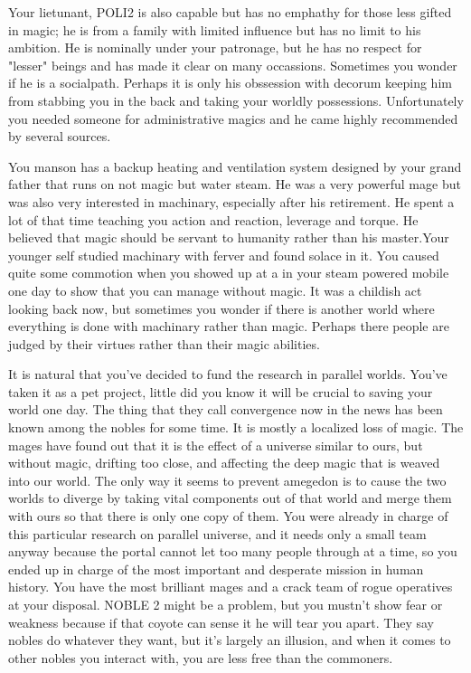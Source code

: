 \documentclass[char]{guildcamp3}
\begin{document}
Your lietunant, POLI2 is also capable but has no emphathy for those less gifted in magic; he is from a family with limited influence but has no limit to his ambition. He is nominally under your patronage, but he has no respect for "lesser" beings and has made it clear on many occassions. Sometimes you wonder if he is a socialpath. Perhaps it is only his obssession with decorum keeping him from stabbing you in the back and taking your worldly possessions. Unfortunately you needed someone for administrative magics and he came highly recommended by several sources. 

You manson has a backup heating and ventilation system designed by your grand father that runs on not magic but water steam. He was a very powerful mage but was also very interested in machinary, especially after his retirement. He spent a lot of that time teaching you action and reaction, leverage and torque. He believed that magic should be servant to humanity rather than his master.Your younger self studied machinary with ferver and found solace in it. You caused quite some commotion when you showed up at a in your steam powered mobile one day to show that you can manage without magic. It was a childish act looking back now, but sometimes you wonder if there is another world where everything is done with machinary rather than magic. Perhaps there people are judged by their virtues rather than their magic abilities.

It is natural that you've decided to fund the research in parallel worlds. You've taken it as a pet project, little did you know it will be crucial to saving your world one day. The thing that they call convergence now in the news has been known among the nobles for some time. It is mostly a localized loss of magic. The mages have found out that it is the effect of a universe similar to ours, but without magic, drifting too close, and affecting the deep magic that is weaved into our world. The only way it seems to prevent amegedon is to cause the two worlds to diverge by taking vital components out of that world and merge them with ours so that there is only one copy of them. You were already in charge of this particular research on parallel universe, and it needs only a small team anyway because the portal cannot let too many people through at a time, so you ended up in charge of the most important and desperate mission in human history. You have the most brilliant mages and a crack team of rogue operatives at your disposal. NOBLE 2 might be a problem, but you mustn't show fear or weakness because if that coyote can sense it he will tear you apart. They say nobles do whatever they want, but it's largely an illusion, and when it comes to other nobles you interact with, you are less free than the commoners.
\end{document}
